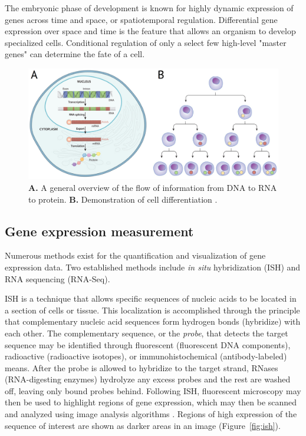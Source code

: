 \documentclass[12pt,oneside,onecolumn,a4paper]{article}
\begin{document}
The embryonic phase of development is known for highly dynamic expression of genes across time and space, or spatiotemporal regulation. Differential gene expression over space and time is the feature that allows an organism to develop specialized cells. Conditional regulation of only a  select few high-level "master genes" can determine the fate of a cell. 
\citep{bisceglia_2010}

\begin{figure}[h!]
\begin{center}
\includegraphics[width=0.8\columnwidth]{figures/Untitled/Untitled}
\caption{\textbf{A.} A general overview of the flow of information from DNA to RNA to protein. \textbf{B.} Demonstration of cell differentiation \citep{bisceglia_2010}.%
}
\end{center}
\end{figure}

\subsection{Gene expression measurement}
Numerous methods exist for the quantification and visualization of gene expression data. Two established methods include \textit{in situ} hybridization (ISH) and RNA sequencing (RNA-Seq). 

ISH is a technique that allows specific sequences of nucleic acids to be located in a section of cells or tissue. This localization is accomplished through the principle that complementary nucleic acid sequences form hydrogen bonds (hybridize) with each other. The complementary sequence, or the \textit{probe}, that detects the target sequence may be identified through fluorescent (fluorescent DNA components), radioactive (radioactive isotopes), or immunohistochemical (antibody-labeled) means. After the probe is allowed to hybridize to the target strand, RNases (RNA-digesting enzymes) hydrolyze any excess probes and the rest are washed off, leaving only bound probes behind. Following ISH, fluorescent microscopy may then be used to highlight regions of gene expression, which may then be scanned and analyzed using image analysis algorithms \citep{Angerer_1991}. Regions of high expression of the sequence of interest are shown as darker areas in an image (Figure~\ref{fig:ish}). 
\end{document}
